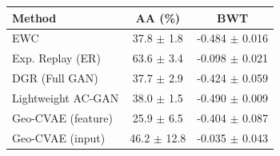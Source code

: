 \begin{tabular}{lcc}
\toprule
\textbf{Method} & \textbf{AA (\%)} & \textbf{BWT} \\
\midrule
EWC & 37.8 $\pm$ 1.8 & -0.484 $\pm$ 0.016 \\
Exp. Replay (ER) & 63.6 $\pm$ 3.4 & -0.098 $\pm$ 0.021 \\
DGR (Full GAN) & 37.7 $\pm$ 2.9 & -0.424 $\pm$ 0.059 \\
Lightweight AC-GAN & 38.0 $\pm$ 1.5 & -0.490 $\pm$ 0.009 \\
Geo-CVAE (feature) & 25.9 $\pm$ 6.5 & -0.404 $\pm$ 0.087 \\
Geo-CVAE (input) & 46.2 $\pm$ 12.8 & -0.035 $\pm$ 0.043 \\
\bottomrule
\end{tabular}
